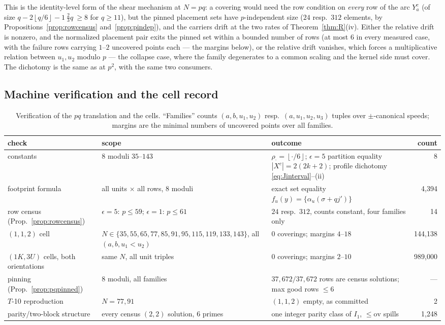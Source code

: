 \documentclass[11pt,a4paper]{article}
\numberwithin{equation}{section}
\theoremstyle{plain}
\theoremstyle{plain}
\theoremstyle{definition}
\theoremstyle{remark}
\newcommand{\floor}[1]{\left\lfloor #1 \right\rfloor}
\begin{document}
This is the identity-level form of the shear mechanism at $N=pq$: a covering
would need the row condition on \emph{every} row of the arc $Y_a^{c}$ (of
size $q-2\floor{q/6}-1\ \tfrac23 q\ \ge 8$ for $q\ge11$), but the pinned
placement sets have $p$-independent size ($24$ resp.\ $312$ elements, by
Propositions~\ref{prop:rowcensus} and~\ref{prop:pindep}), and the carriers
drift at the two rates of Theorem~\ref{thm:R}(iv). Either the relative drift
is nonzero, and the normalized placement pair exits the pinned set within a
bounded number of rows (at most $6$ in every measured case, with the failure
rows carrying $1$--$2$ uncovered points each --- the margins below), or the
relative drift vanishes, which forces a multiplicative relation between
$u_1,u_2$ modulo $p$ --- the collapse case, where the family degenerates to a
common scaling and the kernel side must cover. The dichotomy is the same as
at $p^2$, with the same two consumers.

\subsection{Machine verification and the cell record}\label{sec:pq-verify}

\begin{table}[t]
\centering
\small
\caption{Verification of the $pq$ translation and the cells. ``Families''
counts $(a,b,u_1,u_2)$ resp.\ $(a,u_1,u_2,u_3)$ tuples over $\pm$-canonical
speeds; margins are the minimal numbers of uncovered points over all
families.}
\label{tab:pqverify}
\begin{tabularx}{\textwidth}{@{}lXXr@{}}
\toprule
check & scope & outcome & count \\
\midrule
constants & $8$ moduli $35$--$143$ & $\rho_\cdot=\floor{\cdot/6}$;
$\epsilon{=}5$ partition equality $|X^c|=2(2k{+}2)$; profile dichotomy
\eqref{eq:Jinterval}--(ii) & 8 \\
footprint formula & all units $\times$ all rows, $8$ moduli & exact set
equality $f_u(y)=\{\alpha_u(\sigma+qj')\}$ & 4{,}394 \\
row census (Prop.~\ref{prop:rowcensus}) & $\epsilon=5$: $p\le59$;
$\epsilon=1$: $p\le61$ & $24$ resp.\ $312$, counts constant, four families
only & 14 \\
$(1,1,2)$ cell & $N\in\{35,55,65,77,85,91,95,115,119,133,143\}$, all $(a,b,u_1<u_2)$ & $0$
coverings; margins $4$--$18$ & 144{,}138 \\
$(1K,3U)$ cells, both orientations & same $N$, all unit triples & $0$
coverings; margins $2$--$10$ & 989{,}000 \\
pinning (Prop.~\ref{prop:pqpinned}) & $8$ moduli, all families & $37{,}672/
37{,}672$ rows are census solutions; max good rows $\le6$ & --- \\
$T$-10 reproduction & $N=77,91$ & $(1,1,2)$ empty, as committed & 2 \\
parity/two-block structure & every census $(2,2)$ solution, $6$ primes &
one integer parity class of $I_1$, $\le\mathrm{ov}$ spills & 1{,}248 \\
\bottomrule
\end{tabularx}
\end{table}
\end{document}
